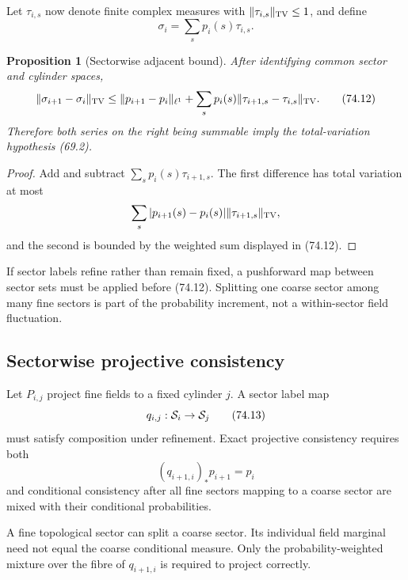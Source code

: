 \documentclass[11pt]{article}
\newtheorem{proposition}[theorem]{Proposition}
\begin{document}
Let \(\tau_{i,s}\) now denote finite complex measures with
\(\lVert\tau_{i,s}\rVert_{\rm TV}\le1\), and define
\[
                              \sigma_i=\sum_sp_i(s)\tau_{i,s}. \tag{74.11}
\]

\begin{proposition}[Sectorwise adjacent bound]
\label{prop:v11v74-adjacent}
After identifying common sector and cylinder spaces,
\[
 \lVert\sigma_{i+1}-\sigma_i\rVert_{\rm TV}
 \le\lVert p_{i+1}-p_i\rVert_{\ell^1}
       +\sum_sp_i(s)
          \lVert\tau_{i+1,s}-\tau_{i,s}\rVert_{\rm TV}.       \tag{74.12}
\]
Therefore both series on the right being summable imply the
total-variation hypothesis (69.2).
\end{proposition}

\begin{proof}
Add and subtract
\(\sum_sp_i(s)\tau_{i+1,s}\).  The first difference has total variation
at most
\[
                         \sum_s|p_{i+1}(s)-p_i(s)|
                              \lVert\tau_{i+1,s}\rVert_{\rm TV},
\]
and the second is bounded by the weighted sum displayed in (74.12).
\end{proof}

If sector labels refine rather than remain fixed, a pushforward map
between sector sets must be applied before (74.12).  Splitting one
coarse sector among many fine sectors is part of the probability
increment, not a within-sector field fluctuation.

\subsection{Sectorwise projective consistency}

Let \(P_{i,j}\) project fine fields to a fixed cylinder \(j\).  A
sector label map
\[
                              q_{i,j}:{\cal S}_i\to{\cal S}_j \tag{74.13}
\]
must satisfy composition under refinement.  Exact projective
consistency requires both
\[
                         (q_{i+1,i})_*p_{i+1}=p_i             \tag{74.14}
\]
and conditional consistency after all fine sectors mapping to a coarse
sector are mixed with their conditional probabilities.

\begin{warning}
\label{warn:v11v74-conditionals}
A fine topological sector can split a coarse sector.  Its individual
field marginal need not equal the coarse conditional measure.
Only the probability-weighted mixture over the fibre of
\(q_{i+1,i}\) is required to project correctly.
\end{warning}
\end{document}
